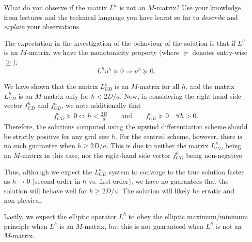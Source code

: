 \begin{problem}{1}
\begin{itemize}
	What do you observe if the matrix $L^h$ is not an $M$-matrix?
	Use your knowledge from lectures and the technical language
	you have learnt so far to \textit{describe} and 
	\textit{explain} your observations.
\end{itemize}

\begin{solution}
The expectation in the investigation of the behaviour of the solution
is that if $L^h$ is an $M$-matrix, we have the monotonicity property
(where $\succeq$ denotes entry-wise $\geq$):
$$L^h u^h \succeq 0 \Rightarrow u^h \succeq 0. $$

We have shown that the matrix $L^h_{UD}$ is an $M$-matrix for all $h$,
and the matrix $L^h_{CD}$ is an $M$-matrix only for $h<2D/a$. Now,
in considering the right-hand side vector $f^h_{CD}$ and $f^h_{UD}$,
we note additionally that
\begin{gather*}
    f^h_{CD} \succeq 0 \Leftrightarrow h < \frac{2D}{a} \qquad
    \text{and} \qquad
    f^h_{UD} \succeq 0 \quad \forall h > 0.
\end{gather*}
Therefore, the solutions computed using the upwind differentiation scheme
should be strictly positive for any grid size $h$. For the centred scheme,
however, there is no such guarantee when $h \geq 2D/a$.
This is due to neither the matrix $L^h_{CD}$ being an $M$-matrix in this
case, nor the right-hand side vector $f^h_{CD}$ being non-negative.

Thus, although we expect the $L^h_{CD}$ system to converge to the true
solution faster as $h\rightarrow 0$ (second order in $h$ vs. first order),
we have no guarantees that the solution will behave well for $h \geq 2D/a$.
The solution will likely be erratic and non-physical.

Lastly, we expect the elliptic operator $L^h$ to obey the elliptic
maximum/minimum principle when $L^h$ is an $M$-matrix, but this is
not guaranteed when $L^h$ is not an $M$-matrix.


\end{solution}
\end{problem}
